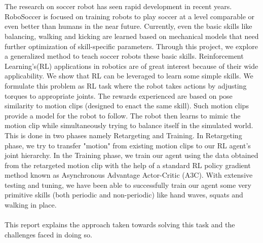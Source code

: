 \begin{Abstract}
\\\\
The research on soccer robot has seen rapid development in recent years. RoboSoccer is focused on training robots to play soccer at a level comparable or even better than humans in the near future. Currently, even the basic skills like balancing, walking and kicking are learned based on mechanical models that need further optimization of skill-specific parameters. Through this project, we explore a generalized method to teach soccer robots these basic skills. Reinforcement Learning's(RL) applications in robotics are of great interest because of their wide applicability. We show that RL can be leveraged to learn some simple skills.  We formulate this problem as RL task where the robot takes actions by adjusting torques to appropriate joints. The rewards experienced are based on pose similarity to motion clips (designed to enact the same skill). Such motion clips provide a model for the robot to follow. The robot then learns to mimic the motion clip while simultaneously trying to balance itself in the simulated world. This is done in two phases namely Retargeting and Training. In Retargeting phase, we try to transfer "motion" from existing motion clips to our RL agent's joint hierarchy. In the Training phase, we train our agent using the data obtained from the retargeted motion clip with the help of a standard RL policy gradient method known as Asynchronous Advantage Actor-Critic (A3C). With extensive testing and tuning, we have been able to successfully train our agent some very primitive skills (both periodic and non-periodic) like hand waves, squats and walking in place. 
\\\\
This report explains the approach taken towards solving this task and the challenges faced in doing so. 
\end{Abstract}

